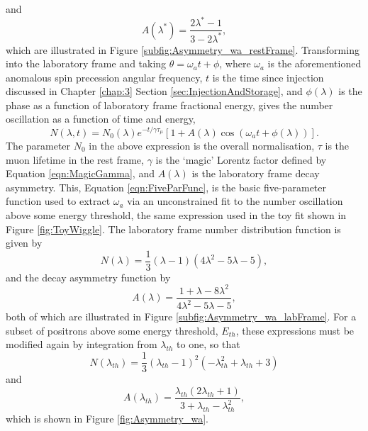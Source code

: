 %
and
%
\begin{equation}
  A(\lambda^{*}) = \frac{2\lambda^{*}-1}{3-2\lambda^{*}},
  \label{eqn:A_restFrame}
\end{equation}
%
which are illustrated in Figure \ref{subfig:Asymmetry_wa_restFrame}. Transforming into the laboratory frame and taking $\theta=\omega_{a}t+\phi$, where $\omega_{a}$ is the aforementioned anomalous spin precession angular frequency, $t$ is the time since injection discussed in Chapter \ref{chap:3} Section \ref{sec:InjectionAndStorage}, and $\phi(\lambda)$ is the phase as a function of laboratory frame fractional energy, gives the number oscillation as a function of time and energy,
%
\begin{equation}
  N(\lambda, t) = N_{0}(\lambda)e^{-t/\gamma\tau_{\mu}}[1+A(\lambda)\cos(\omega_{a}t+\phi(\lambda))].
  \label{eqn:FiveParFunc}
\end{equation}
%
The parameter $N_{0}$ in the above expression is the overall normalisation, $\tau$ is the muon lifetime in the rest frame, $\gamma$ is the `magic' Lorentz factor defined by Equation \ref{eqn:MagicGamma}, and $A(\lambda)$ is the laboratory frame decay asymmetry. This, Equation \ref{eqn:FiveParFunc}, is the basic five-parameter function used to extract $\omega_{a}$ via an unconstrained fit to the number oscillation above some energy threshold, the same expression used in the toy fit shown in Figure \ref{fig:ToyWiggle}. The laboratory frame number distribution function is given by 
%
\begin{equation}
  N(\lambda) = \frac{1}{3}(\lambda-1)(4\lambda^{2}-5\lambda-5),
  \label{eqn:N_labFrame}
\end{equation}
%
and the decay asymmetry function by
%
\begin{equation}
  A(\lambda) = \frac{1+\lambda-8\lambda^{2}}{4\lambda^{2}-5\lambda-5},
  \label{eqn:A_labFrame}
\end{equation}
%
both of which are illustrated in Figure \ref{subfig:Asymmetry_wa_labFrame}. For a subset of positrons above some energy threshold, $E_{th}$, these expressions must be modified again by integration from $\lambda_{th}$ to one, so that
%
\begin{equation}
  N(\lambda_{th}) = \frac{1}{3}(\lambda_{th}-1)^{2}(-\lambda_{th}^{2}+\lambda_{th}+3)
  \label{eqn:Nth_labFrame}
\end{equation}
%
and
%
\begin{equation}
  A(\lambda_{th}) = \frac{\lambda_{th}(2\lambda_{th}+1)}{3+\lambda_{th}-\lambda_{th}^{2}},
  \label{eqn:Ath_labFrame}
\end{equation}
%
which is shown in Figure \ref{fig:Asymmetry_wa}. 

